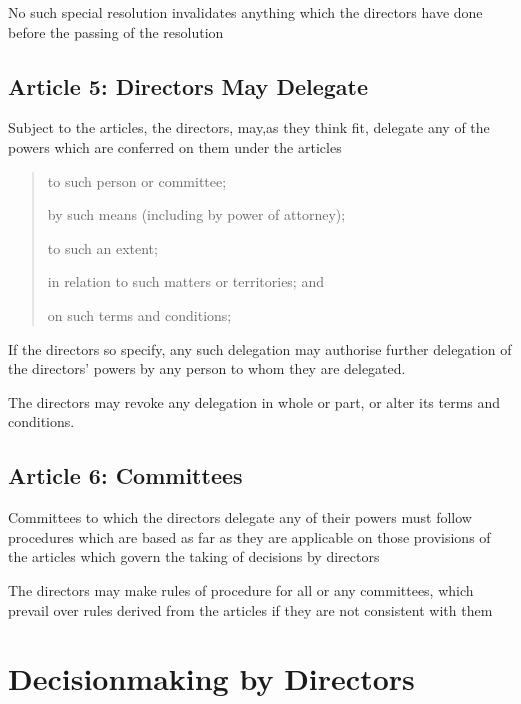 \documentclass[letterpaper,10pt,openany,oneside,english]{sphinxmanual}
\begin{document}
 No such special resolution invalidates anything which the directors have done before the passing of the resolution


\subsection{Article 5: Directors May Delegate}
\label{\detokenize{directors:article-5-directors-may-delegate}}\label{\detokenize{directors:article-5}}
 Subject to the articles, the directors, may,as they think fit, delegate any of the powers which are conferred on them under the articles
\begin{quote}

 to such person or committee;

 by such means (including by power of attorney);

 to such an extent;

 in relation to such matters or territories; and

 on such terms and conditions;
\end{quote}

 If the directors so specify, any such delegation may authorise further delegation of the directors’ powers by any person to whom they are delegated.

 The directors may revoke any delegation in whole or part, or alter its terms and conditions.


\subsection{Article 6: Committees}
\label{\detokenize{directors:article-6-committees}}\label{\detokenize{directors:article-6}}
 Committees to which the directors delegate any of their powers must follow procedures which are based as far as they are applicable on those provisions of the articles which govern the taking of decisions by directors

 The directors may make rules of procedure for all or any committees, which prevail over rules derived from the articles if they are not consistent with them


\section{Decisionmaking by Directors}
\label{\detokenize{directors:decisionmaking-by-directors}}
\end{document}
